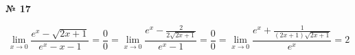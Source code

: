 \documentclass{article}
\begin{document}
\textbf{№ 17} 

\begingroup
\Large

$$ \lim\limits_{x \to 0} \frac{e^x-\sqrt{2x+1}}{e^x-x-1}
= \frac{0}{0}
= \lim\limits_{x \to 0} \frac{e^x-\frac{2}{2\sqrt{2x+1}}}{e^x-1}
= \frac{0}{0} 
= \lim\limits_{x \to 0} \frac{e^x+\frac{1}{(2x+1)\sqrt{2x+1}}}{e^x} 
= 2 $$

\endgroup
\end{document}
